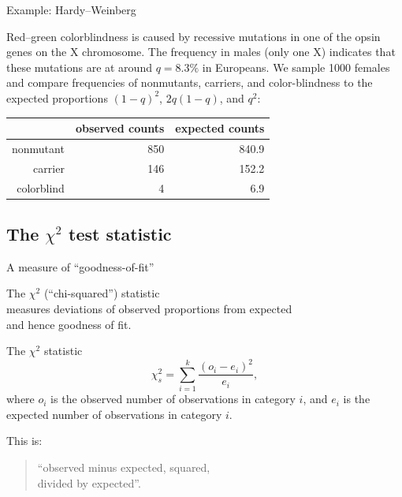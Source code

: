 \begin{frame}{Example: Hardy--Weinberg}

    Red--green colorblindness is caused by recessive mutations in one of the opsin genes on the X chromosome.
    The frequency in males (only one X) indicates that these mutations are at around $q=8.3\%$ in Europeans.
    We sample 1000 females and compare frequencies of nonmutants, carriers, and color-blindness to the expected proportions $(1-q)^2$, $2q(1-q)$, and $q^2$:
    \begin{center}
        \begin{tabular}{r|rr}
            & observed counts & expected counts \\
            \hline 
            nonmutant & 850 & 840.9 \\ 
            carrier &  146 & 152.2 \\ 
            colorblind & 4 & 6.9  
        \end{tabular}
    \end{center}


\end{frame}


\subsection{The $\chi^2$ test statistic}

\begin{frame}{A measure of ``goodness-of-fit''}

  The $\chi^2$ (``chi-squared'') statistic \\
  measures deviations of observed proportions from expected \\
  and hence \alert{goodness of fit}.

    \begin{block}{The $\chi^2$ statistic}
        \[ \chi^2_s = \sum_{i=1}^k \frac{(o_i - e_i)^2}{e_i} , \]
        where $o_i$ is the observed \alert{number} of observations in category $i$,
        and $e_i$ is the expected \alert{number} of observations in category $i$.
    \end{block}


    \vspace{2em}

    This is:\\
    \begin{quote} 
        \alert{``observed minus expected, squared, \\ divided by expected''}.
    \end{quote}


\end{frame}


